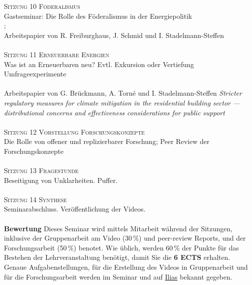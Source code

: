 \documentclass[12pt,a4paper]{article}
\begin{document}
\textsc{Sitzung 10 \dotfill Föderalismus} \smallskip \\ 
{\color{darkgreen}{\Rectangle}} Gastseminar: Die Rolle des Föderalismus in der Energiepolitik\\
{\color{darkgreen}{\Rectangle}} ; \\ {\color{darkgreen}{\Rectangle}} Arbeitspapier von R. Freiburghaus, J. Schmid und I. Stadelmann-Steffen\\
\medskip  \\	

\textsc{Sitzung 11 \dotfill Erneuerbare Energien} \smallskip \\ 
{\color{darkgreen}{\Rectangle}} Was ist an Erneuerbaren neu? Evtl. Exkursion oder Vertiefung Umfrageexperimente \\
{\color{darkgreen}{\Rectangle}}  \\
{\color{darkgreen}{\Rectangle}} Arbeitspapier von G. Brückmann, A. Torné und I. Stadelmann-Steffen \textit{Stricter regulatory measures for climate mitigation in the residential building sector — distributional concerns and effectiveness considerations for public support}\\
\medskip  \\	

\textsc{Sitzung 12 \dotfill Vorstellung Forschungskonzepte} \smallskip \\ 
{\color{darkgreen}{\Rectangle}} Die Rolle von offener und replizierbarer Forschung; Peer Review der Forschungskonzepte\\
\medskip  \\	


\textsc{Sitzung 13 \dotfill Fragestunde} \smallskip \\ 
{\color{darkgreen}{\Rectangle}} Beseitigung von Unklarheiten. Puffer. \\  \medskip  \\	

\textsc{Sitzung 14 \dotfill Synthese}  \smallskip \\ 
{\color{darkgreen}{\Rectangle}} Seminarabschluss. Veröffentlichung der Videos.\\
\medskip  \\	


\noindent\textbf{Bewertung}
Dieses Seminar wird mittels Mitarbeit während der Sitzungen, inklusive der Gruppenarbeit am Video (30\,\%) und peer-review Reports, und der Forschungsarbeit (50\,\%) benotet. Wie üblich, werden 60\,\% der Punkte für das Bestehen der Lehrveranstaltung benötigt, damit Sie die \textbf{6 ECTS} erhalten.\\
Genaue Aufgabenstellungen, für die Erstellung des Videos in Gruppenarbeit und für die Forschungsarbeit werden im Seminar und auf \href{https://ilias.unibe.ch/goto_ilias3_unibe_crs_3414477.html}{Ilias} bekannt gegeben.\\ 
\end{document}
